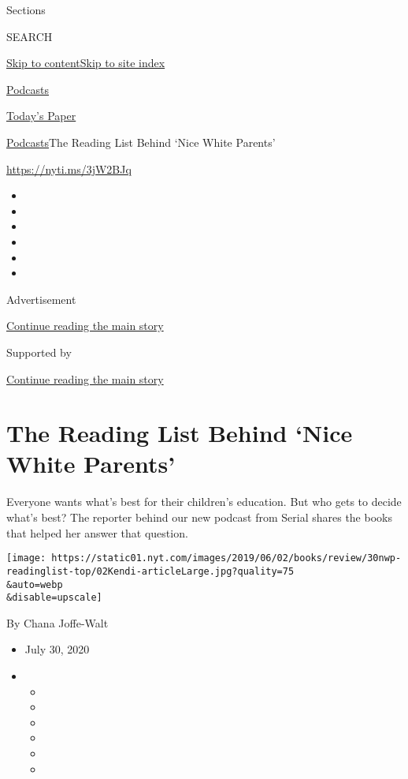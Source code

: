 Sections

SEARCH

\protect\hyperlink{site-content}{Skip to
content}\protect\hyperlink{site-index}{Skip to site index}

\href{https://www.nytimes.com/spotlight/podcasts}{Podcasts}

\href{https://myaccount.nytimes.com/auth/login?response_type=cookie\&client_id=vi}{}

\href{https://www.nytimes.com/section/todayspaper}{Today's Paper}

\href{/spotlight/podcasts}{Podcasts}\textbar{}The Reading List Behind
`Nice White Parents'

\url{https://nyti.ms/3jW2BJq}

\begin{itemize}
\item
\item
\item
\item
\item
\item
\end{itemize}

Advertisement

\protect\hyperlink{after-top}{Continue reading the main story}

Supported by

\protect\hyperlink{after-sponsor}{Continue reading the main story}

\hypertarget{the-reading-list-behind-nice-white-parents}{%
\section{The Reading List Behind `Nice White
Parents'}\label{the-reading-list-behind-nice-white-parents}}

Everyone wants what's best for their children's education. But who gets
to decide what's best? The reporter behind our new podcast from Serial
shares the books that helped her answer that question.

\texttt{[image: https://static01.nyt.com/images/2019/06/02/books/review/30nwp-readinglist-top/02Kendi-articleLarge.jpg?quality=75\\\&auto=webp\\\&disable=upscale]}

By Chana Joffe-Walt

\begin{itemize}
\item
  July 30, 2020
\item
  \begin{itemize}
  \item
  \item
  \item
  \item
  \item
  \item
  \end{itemize}
\end{itemize}

